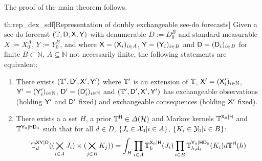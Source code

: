 The proof of the main theorem follows.

\begin{reptheorem}{th:rep_dex_sdf}[Representation of doubly exchangeable see-do forecasts]
Given a see-do forecast $(\mathbb{T},\mathsf{D},\mathsf{X},\mathsf{Y})$ with denumerable $D:=D_0^B$ and standard measurable $X:=X_0^A$, $Y:=Y_0^B$, and where $\mathsf{X}=(\mathsf{X}_i)_{i\in A}$, $\mathsf{Y}=(\mathsf{Y}_i)_{i\in B}$ and $\mathsf{D}=(\mathsf{D}_i)_{i\in B}$ for finite $B\subset \mathbb{N}$, $A\subseteq \mathbb{N}$ not necessarily finite, the following statements are equivalent:

\begin{enumerate}
    \item There exists $(\mathbb{T}',\mathsf{D}',\mathsf{X}',\mathsf{Y}')$ where $\mathbb{T}'$ is an extension of $\mathbb{T}$, $\mathsf{X}'=(\mathsf{X}'_i)_{i\in \mathbb{N}}$, $\mathsf{Y}'=(\mathsf{Y}'_i)_{i\in \mathbb{N}}$, $\mathsf{D}'=(\mathsf{D}'_i)_{i\in\mathbb{N}}$ and $(\mathbb{T}',\mathsf{D}',\mathsf{X}',\mathsf{Y}')$ has exchangeable observations (holding $\mathsf{Y}'$ and $\mathsf{D}'$ fixed) and exchangeable consequences (holding $\mathsf{X}'$ fixed).
    \item There exists a a set $H$, a prior $\mathbb{T}^{\mathsf{H}}\in\Delta(\mathcal{H})$ and Markov kernels $\mathbb{T}^{\mathsf{X}_0|\mathsf{H}}$ and $\mathbb{T}^{\mathsf{Y}_0|\mathsf{H}\mathsf{D}_0}$ such that for all $d\in D$, $\{J_i\in \mathcal{X}_0|i\in A\}$, $\{K_i\in \mathcal{Y}_0|i\in B\}$:
    \begin{align}
        \mathbb{T}^{\mathsf{X}\mathsf{Y}|\mathsf{D}}_{d}((\bigtimes_{i\in A}J_i)\times (\bigtimes_{j\in B} K_j)) = \int_{H} \prod_{i\in A} \mathbb{T}^{\mathsf{X}_0|\mathsf{H}}_h(J_i)\prod_{i\in B}\mathbb{T}_{h,d_i}^{\mathsf{Y}_0|\mathsf{H}\mathsf{D}_0}(K_i)d\mathbb{T}^{\mathsf{H}}(h)
    \end{align}
\end{enumerate}
\end{reptheorem}

